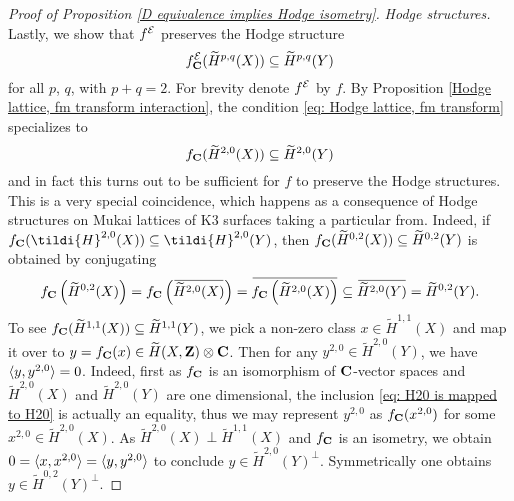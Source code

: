 \begin{proof}[Proof of Proposition \ref{D equivalence implies Hodge isometry}]
    \noindent
    \textsl{Hodge structures.}
    Lastly, we show that $f^{\mathcal E}$ preserves the Hodge structure \ie
    \[
        f^{\mathcal E}_\mathbf C(\widetilde{H}^{p,q}(X)) \subseteq \widetilde{H}^{p,q}(Y) 
    \]
    for all $p$, $q$, with $p + q = 2$. 
    For brevity denote $f^{\mathcal E}$ by $f$. By Proposition \ref{Hodge lattice, fm transform interaction}, the condition \eqref{eq: Hodge lattice, fm transform} specializes to 
    \begin{equation}
        \label{eq: H20 is mapped to H20}
        f_\mathbf C(\widetilde{H}^{2,0}(X)) \subseteq \widetilde{H}^{2,0}(Y)
    \end{equation}
    and in fact this turns out to be sufficient for $f$ to preserve the Hodge structures. This is a very special coincidence, which happens as a consequence of Hodge structures on Mukai lattices of K3 surfaces taking a particular from.
    Indeed, if $f_\C(\tildi{H}^{2,0}(X)) \subseteq \tildi{H}^{2,0}(Y)$, then $f_\mathbf C(\widetilde{H}^{0,2}(X)) \subseteq \widetilde{H}^{0,2}(Y)$ is obtained by conjugating
    \[
        f_\C\left(\widetilde{H}^{0,2}(X)\right) = f_\C\left(\ols{\widetilde{H}^{2,0}(X)}\right) = \ols{f_\C\left(\widetilde{H}^{2,0}(X)\right)} \subseteq \ols{\widetilde{H}^{2,0}(Y)} = \widetilde{H}^{0,2}(Y).
    \]
    To see $f_\mathbf C(\widetilde{H}^{1,1}(X)) \subseteq \widetilde{H}^{1,1}(Y)$, we pick a non-zero class $x \in \widetilde{H}^{1,1}(X)$ and map it over to $y = f_\mathbf C(x) \in \widetilde{H}(X, \mathbf Z) \otimes \mathbf C$. Then for any $y^{2,0} \in \widetilde{H}^{2,0}(Y)$, we have $\langle y, y^{2,0} \rangle = 0$. Indeed, first as $f_\mathbf C$ is an isomorphism of $\mathbf C$-vector spaces and $\widetilde{H}^{2,0}(X)$ and $\widetilde{H}^{2,0}(Y)$ are one dimensional, the inclusion \eqref{eq: H20 is mapped to H20} is actually an equality, thus we may represent $y^{2,0}$ as $f_\mathbf C(x^{2,0})$ for some $x^{2,0} \in \widetilde{H}^{2,0}(X)$. As $\widetilde{H}^{2,0}(X) \perp \widetilde{H}^{1,1}(X)$ and $f_\mathbf C$ is an isometry, we obtain $0 = \langle x, x^{2,0} \rangle = \langle y, y^{2,0} \rangle$ to conclude $y \in \widetilde{H}^{2,0}(Y)^\perp$. Symmetrically one obtains $y \in \widetilde{H}^{0,2}(Y)^\perp$. 


\end{proof}
